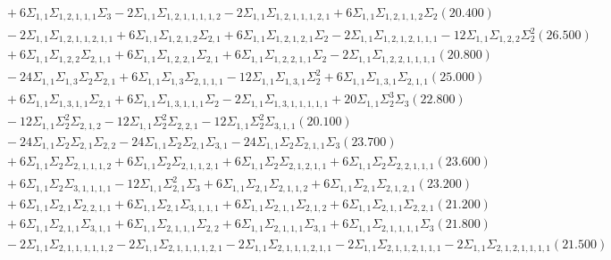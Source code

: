 \documentclass[12pt]{article}
\begin{document}
\begin{landscape}
\begin{align*}
		&\quad\quad +6\Sigma_{1,1}\Sigma_{1,2,1,1,1}\Sigma_{3}-2\Sigma_{1,1}\Sigma_{1,2,1,1,1,1,2}-2\Sigma_{1,1}\Sigma_{1,2,1,1,1,2,1}+6\Sigma_{1,1}\Sigma_{1,2,1,1,2}\Sigma_{2}(20.400) \\ 
		&\quad\quad -2\Sigma_{1,1}\Sigma_{1,2,1,1,2,1,1}+6\Sigma_{1,1}\Sigma_{1,2,1,2}\Sigma_{2,1}+6\Sigma_{1,1}\Sigma_{1,2,1,2,1}\Sigma_{2}-2\Sigma_{1,1}\Sigma_{1,2,1,2,1,1,1}-12\Sigma_{1,1}\Sigma_{1,2,2}\Sigma_{2}^{2}(26.500) \\ 
		&\quad\quad +6\Sigma_{1,1}\Sigma_{1,2,2}\Sigma_{2,1,1}+6\Sigma_{1,1}\Sigma_{1,2,2,1}\Sigma_{2,1}+6\Sigma_{1,1}\Sigma_{1,2,2,1,1}\Sigma_{2}-2\Sigma_{1,1}\Sigma_{1,2,2,1,1,1,1}(20.800) \\ 
		&\quad\quad -24\Sigma_{1,1}\Sigma_{1,3}\Sigma_{2}\Sigma_{2,1}+6\Sigma_{1,1}\Sigma_{1,3}\Sigma_{2,1,1,1}-12\Sigma_{1,1}\Sigma_{1,3,1}\Sigma_{2}^{2}+6\Sigma_{1,1}\Sigma_{1,3,1}\Sigma_{2,1,1}(25.000) \\ 
		&\quad\quad +6\Sigma_{1,1}\Sigma_{1,3,1,1}\Sigma_{2,1}+6\Sigma_{1,1}\Sigma_{1,3,1,1,1}\Sigma_{2}-2\Sigma_{1,1}\Sigma_{1,3,1,1,1,1,1}+20\Sigma_{1,1}\Sigma_{2}^{3}\Sigma_{3}(22.800) \\ 
		&\quad\quad -12\Sigma_{1,1}\Sigma_{2}^{2}\Sigma_{2,1,2}-12\Sigma_{1,1}\Sigma_{2}^{2}\Sigma_{2,2,1}-12\Sigma_{1,1}\Sigma_{2}^{2}\Sigma_{3,1,1}(20.100) \\ 
		&\quad\quad -24\Sigma_{1,1}\Sigma_{2}\Sigma_{2,1}\Sigma_{2,2}-24\Sigma_{1,1}\Sigma_{2}\Sigma_{2,1}\Sigma_{3,1}-24\Sigma_{1,1}\Sigma_{2}\Sigma_{2,1,1}\Sigma_{3}(23.700) \\ 
		&\quad\quad +6\Sigma_{1,1}\Sigma_{2}\Sigma_{2,1,1,1,2}+6\Sigma_{1,1}\Sigma_{2}\Sigma_{2,1,1,2,1}+6\Sigma_{1,1}\Sigma_{2}\Sigma_{2,1,2,1,1}+6\Sigma_{1,1}\Sigma_{2}\Sigma_{2,2,1,1,1}(23.600) \\ 
		&\quad\quad +6\Sigma_{1,1}\Sigma_{2}\Sigma_{3,1,1,1,1}-12\Sigma_{1,1}\Sigma_{2,1}^{2}\Sigma_{3}+6\Sigma_{1,1}\Sigma_{2,1}\Sigma_{2,1,1,2}+6\Sigma_{1,1}\Sigma_{2,1}\Sigma_{2,1,2,1}(23.200) \\ 
		&\quad\quad +6\Sigma_{1,1}\Sigma_{2,1}\Sigma_{2,2,1,1}+6\Sigma_{1,1}\Sigma_{2,1}\Sigma_{3,1,1,1}+6\Sigma_{1,1}\Sigma_{2,1,1}\Sigma_{2,1,2}+6\Sigma_{1,1}\Sigma_{2,1,1}\Sigma_{2,2,1}(21.200) \\ 
		&\quad\quad +6\Sigma_{1,1}\Sigma_{2,1,1}\Sigma_{3,1,1}+6\Sigma_{1,1}\Sigma_{2,1,1,1}\Sigma_{2,2}+6\Sigma_{1,1}\Sigma_{2,1,1,1}\Sigma_{3,1}+6\Sigma_{1,1}\Sigma_{2,1,1,1,1}\Sigma_{3}(21.800) \\ 
		&\quad\quad -2\Sigma_{1,1}\Sigma_{2,1,1,1,1,1,2}-2\Sigma_{1,1}\Sigma_{2,1,1,1,1,2,1}-2\Sigma_{1,1}\Sigma_{2,1,1,1,2,1,1}-2\Sigma_{1,1}\Sigma_{2,1,1,2,1,1,1}-2\Sigma_{1,1}\Sigma_{2,1,2,1,1,1,1}(21.500) \\ 

\end{align*}
\end{landscape}
\end{document}
